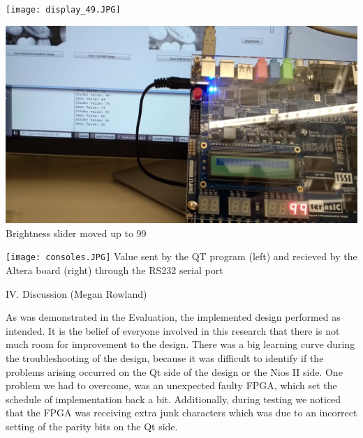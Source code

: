 \documentclass{article}
\newenvironment{Figure}
  {\par\medskip\noindent\ignorespaces\minipage{\linewidth}}
  {\endminipage\par\medskip}
\begin{document}
\begin{multicols*}{2}
\begin{Figure}
 \centering
 \texttt{[image: display\_49.JPG]}
\end{Figure}

\begin{Figure}
 \centering
 \includegraphics[width=\linewidth]{display_99.JPG}
   {Brightness slider moved up to 99}
\end{Figure}


\begin{Figure}
 \centering
 \texttt{[image: consoles.JPG]}
   {Value sent by the QT program (left) and recieved by the Altera board (right) through the RS232 serial port}
\end{Figure}


\vspace{15 pt}



\begin{center}
{\large IV. Discussion (Megan Rowland)}
\end{center}
As was demonstrated in the Evaluation, the implemented design performed as intended. It is the belief of everyone involved in this research that there is not much room for improvement to the design. There was a big learning curve during the troubleshooting of the design, because it was difficult to identify if the problems arising occurred on the Qt side of the design or the Nios II side. One problem we had to overcome, was an unexpected faulty FPGA, which set the schedule of implementation back a bit. Additionally, during testing we noticed that the FPGA was receiving extra junk characters which was due to an incorrect setting of the parity bits on the Qt side.


\end{multicols*}
\end{document}
